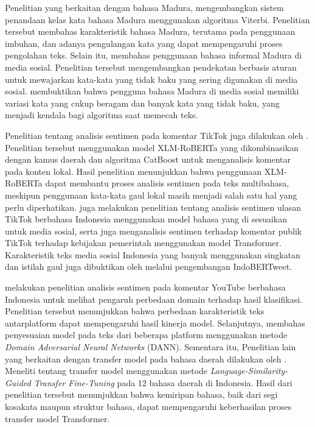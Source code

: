 Penelitian yang berkaitan dengan bahasa Madura, \citet{firmansyah2021klasifikasi} mengembangkan sistem penandaan kelas kata bahasa Madura menggunakan algoritma Viterbi. Penelitian tersebut membahas karakteristik bahasa Madura, terutama pada penggunaan imbuhan, dan adanya pengulangan kata yang dapat mempengaruhi proses pengolahan teks. Selain itu, \citet{arifin2026heuristic} membahas penggunaan bahasa informal Madura di media sosial. Penelitian tersebut mengembangkan pendekatan berbasis aturan untuk mewajarkan kata-kata yang tidak baku yang sering digunakan di media sosial. \citet{arifin2026heuristic} membuktikan bahwa pengguna bahasa Madura di media sosial memiliki variasi kata yang cukup beragam dan banyak kata yang tidak baku, yang menjadi kendala bagi algoritma saat memecah teks.

Penelitian tentang analisis sentimen pada komentar TikTok juga dilakukan oleh \citet{luther2026analisis}. Penelitian tersebut menggunakan model XLM-RoBERTa yang dikombinasikan dengan kamus daerah dan algoritma CatBoost untuk menganalisis komentar pada konten lokal. Hasil penelitian menunjukkan bahwa penggunaan XLM-RoBERTa dapat membantu proses analisis sentimen pada teks multibahasa, meskipun penggunaan kata-kata gaul lokal masih menjadi salah satu hal yang perlu diperhatikan. \citet{setiawan2023sentiment} juga melakukan penelitian tentang analisis sentimen ulasan TikTok berbahasa Indonesia menggunakan model bahasa yang di sesuaikan untuk media sosial, serta \citet{saputra2026reaksi} juga menganalisis sentimen terhadap komentar publik TikTok terhadap kebijakan pemerintah menggunakan model Transformer. Karakteristik teks media sosial Indonesia yang banyak menggunakan singkatan dan istilah gaul juga dibuktikan oleh \citet{koto2021indobertweet} melalui pengembangan IndoBERTweet.

\citet{aribowo2021cross} melakukan penelitian analisis sentimen pada komentar YouTube berbahasa Indonesia untuk melihat pengaruh perbedaan domain terhadap hasil klasifikasi. Penelitian tersebut menunjukkan bahwa perbedaan karakteristik teks antarplatform dapat mempengaruhi hasil kinerja model. Selanjutnya, \citet{zulkifli2025indonesian} membahas penyesuaian model pada teks dari beberapa platform menggunakan metode \textit{Domain Adversarial Neural Networks} (DANN). Sementara itu, Penelitian lain yang berkaitan dengan transfer model pada bahasa daerah dilakukan oleh \citet{darnoto2026language}. Meneliti tentang transfer model menggunakan metode \textit{Language-Similarity-Guided Transfer Fine-Tuning} pada 12 bahasa daerah di Indonesia. Hasil dari penelitian tersebut menunjukkan bahwa kemiripan bahasa, baik dari segi kosakata maupun struktur bahasa, dapat mempengaruhi keberhasilan proses transfer model Transformer.

